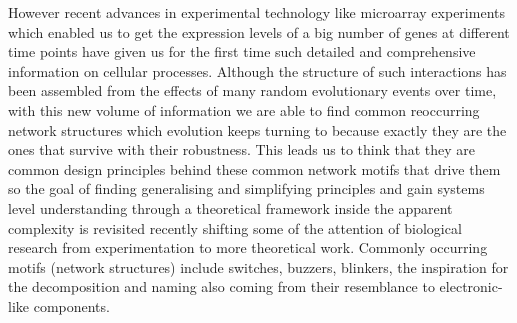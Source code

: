 \documentclass[12pt,a4paper,titlepage]{article}
\begin{document}
However recent advances in experimental technology like microarray experiments which enabled us to get the expression levels of a big number of genes at different time points have given us for the first time such detailed and comprehensive information on cellular processes.  Although the structure of such interactions has been assembled from the effects of many random evolutionary events over time, with this new volume of information we  are able to find common reoccurring network structures which evolution keeps turning to because exactly they are the ones that survive with their robustness. This leads us to think that they are common design principles behind these common network motifs that drive them so the goal of finding generalising and simplifying principles and gain systems level understanding through a theoretical framework inside the apparent complexity is revisited recently shifting some of the attention of biological research from experimentation to more theoretical work\cite{alon2007introduction}. Commonly occurring motifs (network structures) include switches, buzzers, blinkers\cite{tyson2003sniffers}, the inspiration for the decomposition and naming also coming from their resemblance to electronic-like components.
\end{document}
